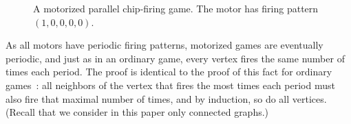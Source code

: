 \begin{centering}
\begin{figure}
  \caption{A motorized parallel chip-firing game. The motor has firing pattern
    $(1,0,0,0,0)$.}
  \label{motorizedTreeNoGlider}
\end{figure}
\end{centering}

As all motors have periodic firing patterns, motorized games are
eventually periodic, and just as in an ordinary
game, every vertex fires the same number of times each period.  The proof is
identical to the proof of this fact for ordinary games~\cite{jiang}: all
neighbors of the vertex that fires the most times each period must also fire
that maximal number of times, and by induction, so do all vertices. (Recall
that we consider in this paper only connected graphs.)

